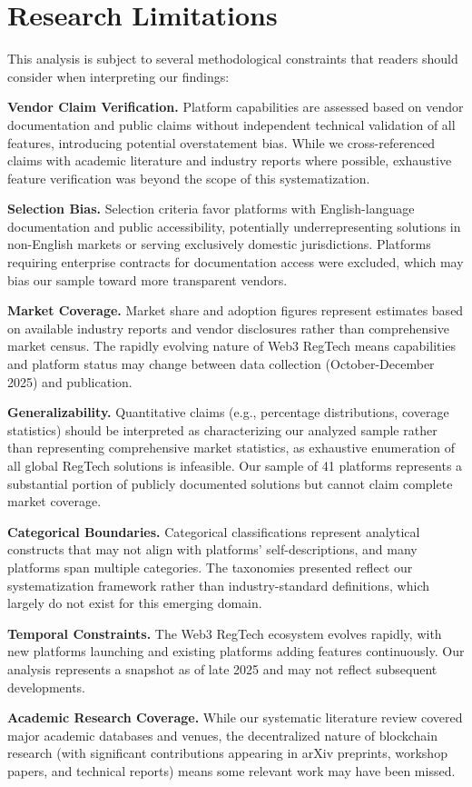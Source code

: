 \section*{Research Limitations}
\label{appendix:limitations}

This analysis is subject to several methodological constraints that readers should consider when interpreting our findings:

\noindent\textbf{Vendor Claim Verification.} Platform capabilities are assessed based on vendor documentation and public claims without independent technical validation of all features, introducing potential overstatement bias. While we cross-referenced claims with academic literature and industry reports where possible, exhaustive feature verification was beyond the scope of this systematization.

\noindent\textbf{Selection Bias.} Selection criteria favor platforms with English-language documentation and public accessibility, potentially underrepresenting solutions in non-English markets or serving exclusively domestic jurisdictions. Platforms requiring enterprise contracts for documentation access were excluded, which may bias our sample toward more transparent vendors.

\noindent\textbf{Market Coverage.} Market share and adoption figures represent estimates based on available industry reports and vendor disclosures rather than comprehensive market census. The rapidly evolving nature of Web3 RegTech means capabilities and platform status may change between data collection (October-December 2025) and publication.

\noindent\textbf{Generalizability.} Quantitative claims (e.g., percentage distributions, coverage statistics) should be interpreted as characterizing our analyzed sample rather than representing comprehensive market statistics, as exhaustive enumeration of all global RegTech solutions is infeasible. Our sample of 41 platforms represents a substantial portion of publicly documented solutions but cannot claim complete market coverage.

\noindent\textbf{Categorical Boundaries.} Categorical classifications represent analytical constructs that may not align with platforms' self-descriptions, and many platforms span multiple categories. The taxonomies presented reflect our systematization framework rather than industry-standard definitions, which largely do not exist for this emerging domain.

\noindent\textbf{Temporal Constraints.} The Web3 RegTech ecosystem evolves rapidly, with new platforms launching and existing platforms adding features continuously. Our analysis represents a snapshot as of late 2025 and may not reflect subsequent developments.

\noindent\textbf{Academic Research Coverage.} While our systematic literature review covered major academic databases and venues, the decentralized nature of blockchain research (with significant contributions appearing in arXiv preprints, workshop papers, and technical reports) means some relevant work may have been missed.
